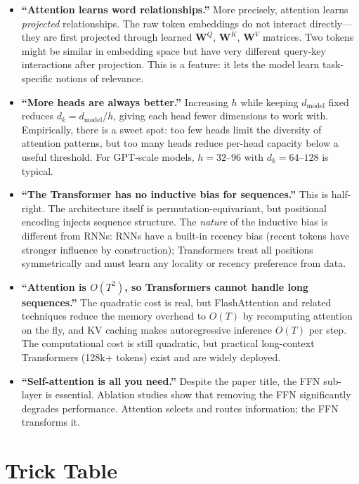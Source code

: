 \begin{itemize}
    \item \textbf{``Attention learns word relationships.''} More precisely, attention learns \emph{projected} relationships. The raw token embeddings do not interact directly---they are first projected through learned $\mathbf{W}^Q$, $\mathbf{W}^K$, $\mathbf{W}^V$ matrices. Two tokens might be similar in embedding space but have very different query-key interactions after projection. This is a feature: it lets the model learn task-specific notions of relevance.

    \item \textbf{``More heads are always better.''} Increasing $h$ while keeping $d_{\text{model}}$ fixed reduces $d_k = d_{\text{model}} / h$, giving each head fewer dimensions to work with. Empirically, there is a sweet spot: too few heads limit the diversity of attention patterns, but too many heads reduce per-head capacity below a useful threshold. For GPT-scale models, $h = 32$--$96$ with $d_k = 64$--$128$ is typical.

    \item \textbf{``The Transformer has no inductive bias for sequences.''} This is half-right. The architecture itself is permutation-equivariant, but positional encoding injects sequence structure. The \emph{nature} of the inductive bias is different from RNNs: RNNs have a built-in recency bias (recent tokens have stronger influence by construction); Transformers treat all positions symmetrically and must learn any locality or recency preference from data.

    \item \textbf{``Attention is $O(T^2)$, so Transformers cannot handle long sequences.''} The quadratic cost is real, but FlashAttention and related techniques reduce the memory overhead to $O(T)$ by recomputing attention on the fly, and KV caching makes autoregressive inference $O(T)$ per step. The computational cost is still quadratic, but practical long-context Transformers (128k+ tokens) exist and are widely deployed.

    \item \textbf{``Self-attention is all you need.''} Despite the paper title, the FFN sub-layer is essential. Ablation studies show that removing the FFN significantly degrades performance. Attention selects and routes information; the FFN transforms it.
\end{itemize}


\section{Trick Table}

